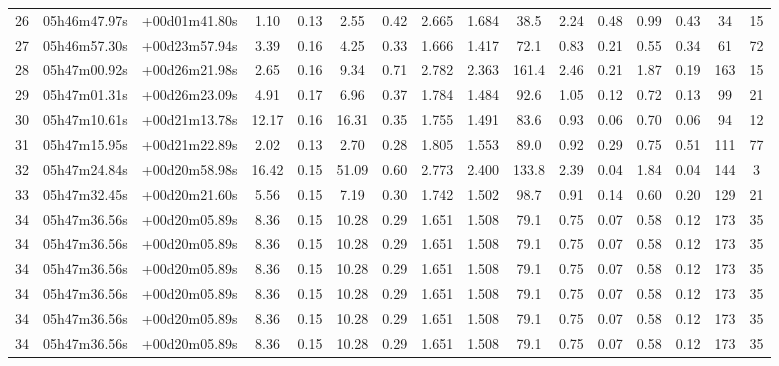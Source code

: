 \begin{landscape}
\begin{ThreePartTable}
\begin{xltabular}{\linewidth}{Xccccccccccccccc}
            26 &  05h46m47.97s &  +00d01m41.80s &  1.10 &    0.13 &  2.55 &     0.42 & 2.665 & 1.684 &  38.5 &  2.24 &    0.48 &  0.99 &    0.43 &   34 &      15 \\
            27 &  05h46m57.30s &  +00d23m57.94s &  3.39 &    0.16 &  4.25 &     0.33 & 1.666 & 1.417 &  72.1 &  0.83 &    0.21 &  0.55 &    0.34 &   61 &      72 \\
            28 &  05h47m00.92s &  +00d26m21.98s &  2.65 &    0.16 &  9.34 &     0.71 & 2.782 & 2.363 & 161.4 &  2.46 &    0.21 &  1.87 &    0.19 &  163 &      15 \\
            29 &  05h47m01.31s &  +00d26m23.09s &  4.91 &    0.17 &  6.96 &     0.37 & 1.784 & 1.484 &  92.6 &  1.05 &    0.12 &  0.72 &    0.13 &   99 &      21 \\
            30 &  05h47m10.61s &  +00d21m13.78s & 12.17 &    0.16 & 16.31 &     0.35 & 1.755 & 1.491 &  83.6 &  0.93 &    0.06 &  0.70 &    0.06 &   94 &      12 \\
            31 &  05h47m15.95s &  +00d21m22.89s &  2.02 &    0.13 &  2.70 &     0.28 & 1.805 & 1.553 &  89.0 &  0.92 &    0.29 &  0.75 &    0.51 &  111 &      77 \\
            32 &  05h47m24.84s &  +00d20m58.98s & 16.42 &    0.15 & 51.09 &     0.60 & 2.773 & 2.400 & 133.8 &  2.39 &    0.04 &  1.84 &    0.04 &  144 &       3 \\
            33 &  05h47m32.45s &  +00d20m21.60s &  5.56 &    0.15 &  7.19 &     0.30 & 1.742 & 1.502 &  98.7 &  0.91 &    0.14 &  0.60 &    0.20 &  129 &      21 \\
            34 &  05h47m36.56s &  +00d20m05.89s &  8.36 &    0.15 & 10.28 &     0.29 & 1.651 & 1.508 &  79.1 &  0.75 &    0.07 &  0.58 &    0.12 &  173 &      35 \\
            34 &  05h47m36.56s &  +00d20m05.89s &  8.36 &    0.15 & 10.28 &     0.29 & 1.651 & 1.508 &  79.1 &  0.75 &    0.07 &  0.58 &    0.12 &  173 &      35 \\
            34 &  05h47m36.56s &  +00d20m05.89s &  8.36 &    0.15 & 10.28 &     0.29 & 1.651 & 1.508 &  79.1 &  0.75 &    0.07 &  0.58 &    0.12 &  173 &      35 \\
            34 &  05h47m36.56s &  +00d20m05.89s &  8.36 &    0.15 & 10.28 &     0.29 & 1.651 & 1.508 &  79.1 &  0.75 &    0.07 &  0.58 &    0.12 &  173 &      35 \\
            34 &  05h47m36.56s &  +00d20m05.89s &  8.36 &    0.15 & 10.28 &     0.29 & 1.651 & 1.508 &  79.1 &  0.75 &    0.07 &  0.58 &    0.12 &  173 &      35 \\
            34 &  05h47m36.56s &  +00d20m05.89s &  8.36 &    0.15 & 10.28 &     0.29 & 1.651 & 1.508 &  79.1 &  0.75 &    0.07 &  0.58 &    0.12 &  173 &      35 \\
        \end{xltabular}
    \end{ThreePartTable}
\end{landscape}